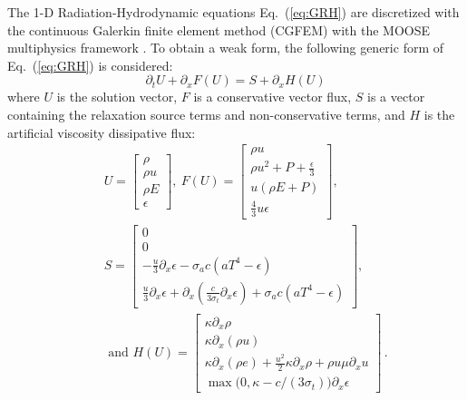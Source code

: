 \documentclass[review]{elsarticle}
\newcommand{\eqt}[1]{Eq.~(\ref{#1})}                     %
\begin{document}
The 1-D Radiation-Hydrodynamic equations \eqt{eq:GRH} are discretized with the continuous Galerkin finite element method (CGFEM) with the MOOSE multiphysics framework \cite{Moose}. To obtain a weak form, the following generic form of \eqt{eq:GRH} is considered:
\begin{equation}
\label{eq:form}
\partial_t U + \partial_x F \left( U \right) = S + \partial_x H \left(U\right)
\end{equation}
where $U$ is the solution vector, $F$ is a conservative vector flux, $S$ is a vector containing the relaxation source terms and non-conservative terms, and $H$ is the artificial viscosity dissipative flux:
\begin{eqnarray*}
&&U = 
\begin{bmatrix}
\rho \\
\rho u \\
\rho E \\
\epsilon
\end{bmatrix}
,\
F(U) = 
\begin{bmatrix}
\rho u \\
\rho u^2 + P + \frac{\epsilon}{3} \\
u \left( \rho E + P \right) \\
\frac{4}{3} u \epsilon
\end{bmatrix}
,\ \\
&&S = 
\begin{bmatrix}
0 \\
0 \\
-\frac{u}{3} \partial_x \epsilon - \sigma_a c \left( a T^4 - \epsilon \right) \\
\frac{u}{3} \partial_x \epsilon + \partial_x \left( \frac{c}{3 \sigma_t} \partial_x \epsilon \right) + \sigma_a c \left( a T^4 - \epsilon \right)
\end{bmatrix}
,
\\
&&\text{ and } 
H(U) = 
\begin{bmatrix}
\kappa \partial_x \rho \\
\kappa \partial_x (\rho u) \\
\kappa \partial_x \left( \rho e \right) + \frac{u^2}{2} \kappa \partial_x \rho + \rho u \mu \partial_x u \\
\max \big( 0, \kappa- c/(3 \sigma_t) \big) \partial_x \epsilon 
\end{bmatrix} \,.
\end{eqnarray*}
\end{document}

